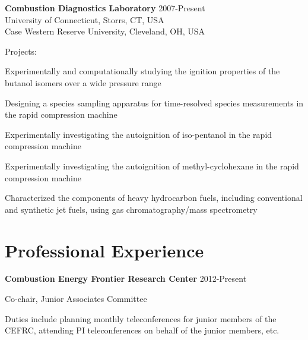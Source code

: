 {\large \bf Combustion Diagnostics Laboratory} \hfill 2007-Present\\
University of Connecticut, Storrs, CT, USA\\
Case Western Reserve University, Cleveland, OH, USA
\begin{outerlist}
\item[] Projects:
   \begin{innerlist}
   \item Experimentally and computationally studying the ignition properties of the butanol isomers over a wide pressure range
   \item Designing a species sampling apparatus for time-resolved species measurements in the rapid compression machine
   \item Experimentally investigating the autoignition of iso-pentanol in the rapid compression machine
   \item Experimentally investigating the autoignition of methyl-cyclohexane in the rapid compression machine
   \item Characterized the components of heavy hydrocarbon fuels, including conventional and synthetic jet fuels, using gas chromatography/mass spectrometry
   \end{innerlist}

\end{outerlist}

\section{Professional Experience}
   {\bf Combustion Energy Frontier Research Center} \hfill 2012-Present
   \begin{innerlist}
      \item Co-chair, Junior Associates Committee
      \item Duties include planning monthly teleconferences for junior members of the CEFRC, attending PI teleconferences on behalf of the junior members, etc.
   \end{innerlist}

